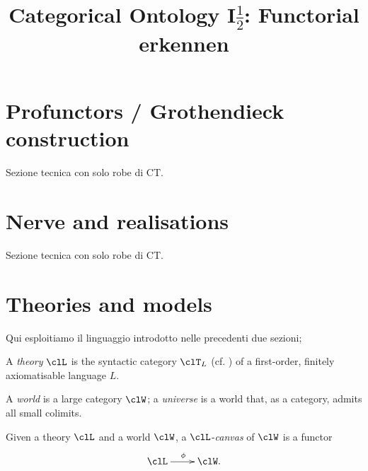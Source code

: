\documentclass[a4paper]{../birkjour}
\title{Categorical Ontology I$\frac{1}{2}$: Functorial erkennen}
\begin{document}
\maketitle
\tableofcontents


\section{Profunctors / Grothendieck construction}
\label{sec:org7dd09e1}
Sezione tecnica con solo robe di CT.
\section{Nerve and realisations}
\label{sec:org1a423df}
Sezione tecnica con solo robe di CT.
\section{Theories and models}
\label{sec:orge02f333}
Qui esploitiamo il linguaggio introdotto nelle precedenti due sezioni;
\begin{definition}[Theory]
  A \emph{theory} $\clL$ is the syntactic category $\clT_L$ (cf. \cite{}) of a first-order, finitely axiomatisable language $L$.
\end{definition}
\begin{definition}
  A \emph{world} is a large category $\clW$; a \emph{universe} is a world that, as a category, admits all small colimits.
\end{definition}
Given a theory $\clL$ and a world $\clW$, a $\clL$-\emph{canvas} of $\clW$ is a functor 
\[\xymatrix{\clL \ar[r]^\phi & \clW.}\]
\end{document}
